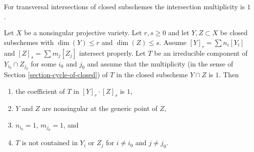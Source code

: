 \noindent
For transversal intersections of closed subschemes the intersection
multiplicity is $1$.

\begin{lemma}
\label{lemma-transversal-subschemes}
Let $X$ be a nonsingular projective variety. Let $r, s \geq 0$ and let
$Y, Z \subset X$ be closed subschemes with $\dim(Y) \leq r$ and
$\dim(Z) \leq s$. Assume $[Y]_r = \sum n_i[Y_i]$ and
$[Z]_s = \sum m_j[Z_j]$ intersect properly.
Let $T$ be an irreducible component of $Y_{i_0} \cap Z_{j_0}$
for some $i_0$ and $j_0$ and assume that the multiplicity
(in the sense of Section \ref{section-cycle-of-closed}) of $T$
in the closed subscheme $Y \cap Z$ is $1$.
Then
\begin{enumerate}
\item the coefficient of $T$ in $[Y]_r \cdot [Z]_s$ is $1$,
\item $Y$ and $Z$ are nonsingular at the generic point of $Z$,
\item $n_{i_0} = 1$, $m_{j_0} = 1$, and
\item $T$ is not contained in $Y_i$ or $Z_j$ for $i \not = i_0$ and
$j \not = j_0$.
\end{enumerate}
\end{lemma}

